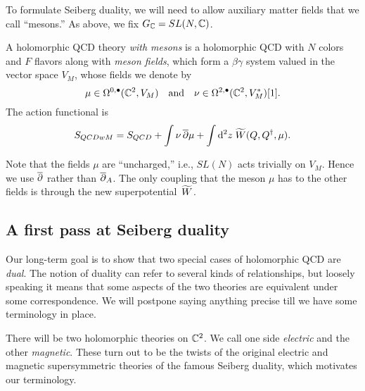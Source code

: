 \documentclass[11pt]{amsart}
\def\SU{{\rm SU}}
\def\til{\Tilde}
\begin{document}
To formulate Seiberg duality, we will need to allow auxiliary matter fields that we call ``mesons.''
As above, we fix $G_{\mathbb C} = SL(N,\mathbb C)$.

\begin{dfn}
A holomorphic QCD theory {\em with mesons}
is a holomorphic QCD with $N$ colors and $F$ flavors along with {\em meson fields}, which form a $\beta\gamma$ system valued in the vector space $V_M$, whose fields we denote by
\[
\mu \in \Omega^{0,\bullet}(\mathbb C^2 , V_M) \quad\text{and}\quad \nu \in \Omega^{2,\bullet}(\mathbb C^2 , V_M^*) [1] .
\]
The action functional is
\[
S_{QCDwM} = S_{QCD} + \int \nu \,\dbar \mu + \int \d^2 z \; \til W(Q, Q^\dag, \mu) .
\] 
\end{dfn}

Note that the fields $\mu$ are ``uncharged,'' i.e., $SL(N)$ acts trivially on $V_M$.
Hence we use ${\overline{\partial}}$ rather than ${\overline{\partial}}_A$.
The only coupling that the meson $\mu$ has to the other fields is through the new superpotential~$\til W$. 

\subsection{A first pass at Seiberg duality}

Our long-term goal is to show that two special cases of holomorphic QCD are {\em dual}.
The notion of duality can refer to several kinds of relationships,
but loosely speaking it means that some aspects of the two theories are equivalent under some correspondence.
We will postpone saying anything precise till we have some terminology in place.


There will be two holomorphic theories on $\mathbb C^2$. 
We call one side {\em electric} and the other {\em magnetic}.
These turn out to be the twists of the original electric and magnetic supersymmetric theories of the famous Seiberg duality, 
which motivates our terminology.
\end{document}
